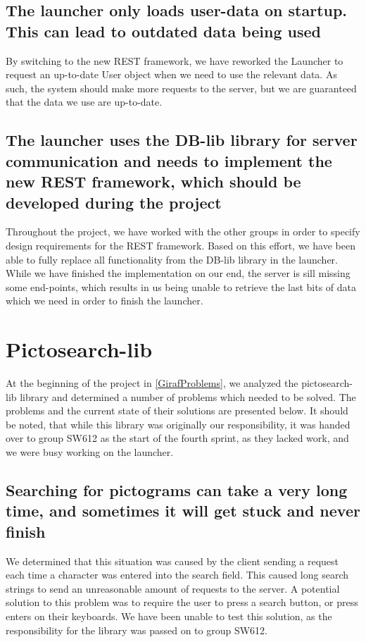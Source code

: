 \subsection*{The launcher only loads user-data on startup. This can lead to outdated data
being used}
By switching to the new REST framework, we have reworked the
Launcher to request an up-to-date User object when we need to use the relevant
data. As such, the system should make more requests to the server, but we are
guaranteed that the data we use are up-to-date.

\subsection*{The launcher uses the DB-lib library for server communication and needs to
implement the new REST framework, which should be developed during the project}
Throughout the project, we have worked with the other groups in order to
specify design requirements for the REST framework. Based on this effort, we
have been able to fully replace all functionality from the DB-lib library in the
launcher. While we have finished the implementation on our end, the server is
sill missing some end-points, which results in us being unable to retrieve the
last bits of data which we need in order to finish the launcher.

\section{Pictosearch-lib}
At the beginning of the project in \autoref{GirafProblems}, we analyzed the
pictosearch-lib library and determined a number of problems which needed to be
solved. The problems and the current state of their solutions are presented
below. It should be noted, that while this library was originally our
responsibility, it was handed over to group SW612 as the start of the fourth
sprint, as they lacked work, and we were busy working on the launcher. 

\subsection*{Searching for pictograms can take a very long time, and sometimes
it will get stuck and never finish}
We determined that this situation was caused by the client sending a request
each time a character was entered into the search field. This caused long search
strings to send an unreasonable amount of requests to the server. A
potential solution to this problem was to require the user to press a search
button, or press enters on their keyboards. We have been unable to test this
solution, as the responsibility for the library was passed on to group SW612.
  

